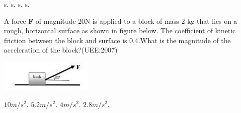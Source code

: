 \documentclass[12pt,addpoints]{exam}
\begin{document}
\begin{questions}
\begin{oneparchoices}
		 s.
		 s.
		 s.
		 s.
	\end{oneparchoices}
	\question A force \textbf{F} of magnitude 20N is applied to a block of mass 2 kg that lies on a rough, horizontal surface as shown in figure below. The coefficient of kinetic friction between the block and surface is 0.4.What is the magnitude of the acceleration of the block?(UEE:2007) 
	\begin{center}
		\includegraphics[scale=0.6]{fig2.jpq.jpg}
	\end{center}
	\begin{oneparchoices}
	\choice $10m/s^2.$
	\choice $5.2m/s^2.$
	\choice $4m/s^2.$
	\choice $2.8m/s^2.$
	\end{oneparchoices}
\end{questions}
\end{document}
